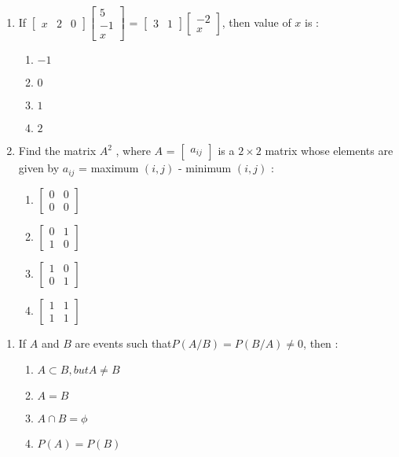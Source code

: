 \documentclass{article}
\providecommand{\myvec}[1]{\ensuremath{\begin{bmatrix}#1\end{bmatrix}}}
\providecommand{\brak}[1]{\ensuremath{\left(#1\right)}}
\begin{document}
\begin{enumerate}
        \item If $\myvec{x & 2 & 0} \myvec {5 \\ -1 \\ x}$ = $ \myvec{3 & 1} \myvec {-2 \\ x}$, then value of $x$ is :
                \begin{enumerate}
                \item $-1$
                        \item $0$
                        \item $1$
                        \item $2$
\end{enumerate}
	\item Find the matrix $A ^2$ , where $A$ = \myvec{a_{ij}} is a $2\times2$ matrix whose elements are given by $a_{ij}$ = maximum $\brak{i,j}$ - minimum $\brak{i,j}$ :
                \begin{enumerate}
                \item $\myvec{0 & 0\\0 & 0}$
                        \item $\myvec{0 & 1\\1 & 0}$
                                \item $\myvec{1 & 0 \\0 & 1}$
                                        \item $\myvec{1 & 1\\1 & 1}$
		\end{enumerate}
		\end{enumerate}
				\begin{enumerate}
						\section{PROBABILITY}
					\item If $A$ and $B$ are events such that$ P(A/B) = P(B/A) \neq 0$, then
:

			\begin{enumerate}
                                                                 \item $A \subset B, but A \neq B$
                \item $A = B$
                \item $A\cap B = \phi$
			\item $P\brak{A} = P\brak{B}$                                                                                                                                                              \end{enumerate}
				\end{enumerate}
\end{document}
